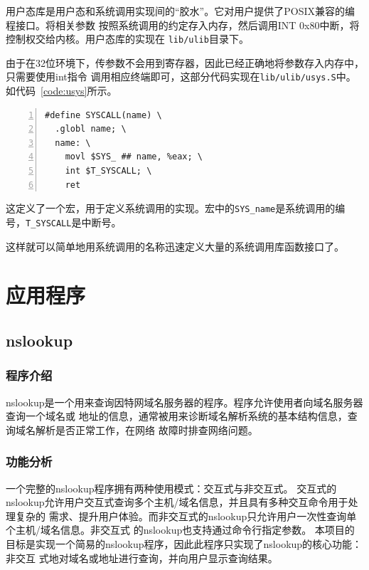 \documentclass[a4paper,twoside]{ctexrep}
\begin{document}
\begin{spacing}{1.2}
用户态库是用户态和系统调用实现间的“胶水”。它对用户提供了POSIX兼容的编程接口。将相关参数
按照系统调用的约定存入内存，然后调用INT 0x80中断，将控制权交给内核。用户态库的实现在
\texttt{lib/ulib}目录下。

由于在32位环境下，传参数不会用到寄存器，因此已经正确地将参数存入内存中，只需要使用int指令
调用相应终端即可，这部分代码实现在\texttt{lib/ulib/usys.S}中。如代码~\ref{code:usys}所示。
\begin{lstlisting}[numbers=left,style=CppStyle,caption={usys.S中的系统调用实现},label={code:usys}]
#define SYSCALL(name) \
  .globl name; \
  name: \
    movl $SYS_ ## name, %eax; \
    int $T_SYSCALL; \
    ret
\end{lstlisting}
这定义了一个宏，用于定义系统调用的实现。宏中的\texttt{SYS\_name}是系统调用的编号，\texttt{T\_SYSCALL}是中断号。

这样就可以简单地用系统调用的名称迅速定义大量的系统调用库函数接口了。


\section{应用程序}
\label{sec:netapp}

\subsection{nslookup}
\label{sec:nslookup}

\subsubsection{程序介绍}

nslookup是一个用来查询因特网域名服务器的程序。程序允许使用者向域名服务器查询一个域名或
地址的信息，通常被用来诊断域名解析系统的基本结构信息，查询域名解析是否正常工作，在网络
故障时排查网络问题。

\subsubsection{功能分析}

一个完整的nslookup程序拥有两种使用模式：交互式与⾮交互式。
交互式的nslookup允许用户交互式查询多个主机/域名信息，并且具有多种交互命令用于处理复杂的
需求、提升用户体验。而⾮交互式的nslookup只允许用户一次性查询单个主机/域名信息。⾮交互式
的nslookup也⽀持通过命令⾏指定参数。
本项⽬的⽬标是实现一个简易的nslookup程序，因此此程序只实现了nslookup的核⼼功能：⾮交互
式地对域名或地址进⾏查询，并向用户显示查询结果。


\end{spacing}
\end{document}
